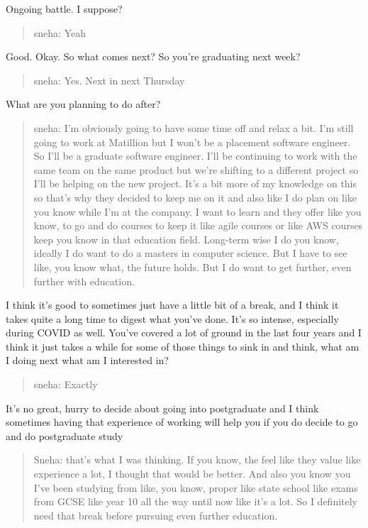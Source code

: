 \documentclass[
]{book}
\begin{document}
Ongoing battle. I suppose?

\begin{quote}
sneha: Yeah
\end{quote}

Good. Okay. So what comes next? So you're graduating next week?

\begin{quote}
sneha: Yes. Next in next Thursday
\end{quote}

What are you planning to do after?

\begin{quote}
sneha: I'm obviously going to have some time off and relax a bit. I'm still going to work at Matillion but I won't be a placement software engineer. So I'll be a graduate software engineer. I'll be continuing to work with the same team on the same product but we're shifting to a different project so I'll be helping on the new project. It's a bit more of my knowledge on this so that's why they decided to keep me on it and also like I do plan on like you know while I'm at the company. I want to learn and they offer like you know, to go and do courses to keep it like agile courses or like AWS courses keep you know in that education field. Long-term wise I do you know, ideally I do want to do a masters in computer science. But I have to see like, you know what, the future holds. But I do want to get further, even further with education.
\end{quote}

I think it's good to sometimes just have a little bit of a break, and I think it takes quite a long time to digest what you've done. It's so intense, especially during COVID as well. You've covered a lot of ground in the last four years and I think it just takes a while for some of those things to sink in and think, what am I doing next what am I interested in?

\begin{quote}
sneha: Exactly
\end{quote}

It's no great, hurry to decide about going into postgraduate and I think sometimes having that experience of working will help you if you do decide to go and do postgraduate study

\begin{quote}
Sneha: that's what I was thinking. If you know, the feel like they value like experience a lot, I thought that would be better. And also you know you I've been studying from like, you know, proper like state school like exams from GCSE like year 10 all the way until now like it's a lot. So I definitely need that break before pursuing even further education.
\end{quote}
\end{document}
